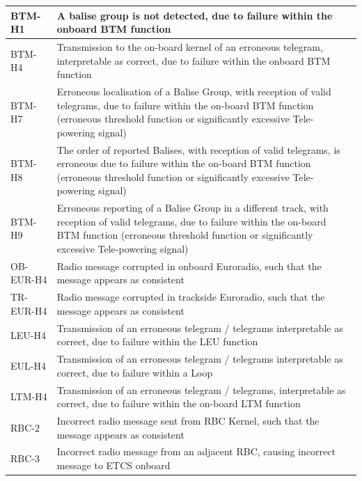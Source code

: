 \documentclass{template/openetcs_article}
\begin{document}
\begin{center}
\begin{longtable}{|m{3cm}|m{13cm}|}
BTM-H1 & A balise group is not detected, due to failure within the onboard BTM function\\\hline
BTM-H4 & Transmission to the on-board kernel of an erroneous telegram, interpretable as correct, due to failure within the onboard BTM function\\\hline
BTM-H7 & Erroneous localisation of a Balise Group, with reception of valid telegrams, due to failure within the on-board BTM function (erroneous threshold function or significantly excessive Tele-powering signal)\\\hline
BTM-H8 &The order of reported Balises, with reception of valid telegrams, is erroneous due to failure within the on-board BTM function (erroneous threshold function or significantly excessive Tele-powering signal) \\\hline
BTM-H9 & Erroneous reporting of a Balise Group in a different track, with reception of valid telegrams, due to failure within the on-board BTM function (erroneous threshold function or significantly excessive Tele-powering signal)\\\hline
OB-EUR-H4 & Radio message corrupted in onboard Euroradio, such that the message appears as consistent\\\hline
TR-EUR-H4 & Radio message corrupted in trackside Euroradio, such that the message appears as consistent\\\hline
LEU-H4 & Transmission of an erroneous telegram / telegrams interpretable as correct, due to failure within the LEU function\\\hline
EUL-H4 & Transmission of an erroneous telegram / telegrams interpretable as correct, due to failure within a Loop\\\hline
LTM-H4 & Transmission of an erroneous telegram / telegrams, interpretable as correct, due to failure within the on-board LTM function\\\hline
RBC-2 & Incorrect radio message sent from RBC Kernel, such that the message appears as consistent\\\hline
RBC-3 & Incorrect radio message from an adjacent RBC, causing incorrect message to ETCS onboard\\\hline
\end{longtable}
\end{center}
\end{document}
